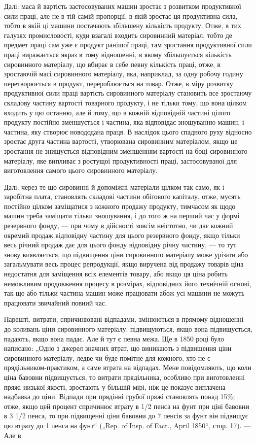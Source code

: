 Далі: маса й вартість застосовуваних машин зростає з розвитком
продуктивної сили праці, але не в тій самій пропорції,
в якій зростає ця продуктивна сила, тобто в якій ці машини
постачають збільшену кількість продукту. Отже, в тих галузях
промисловості, куди взагалі входить сировинний матеріал, тобто
де предмет праці сам уже є продукт ранішої праці, там зростання
продуктивної сили праці виражається якраз в тому відношенні,
в якому збільшується кількість сировинного матеріалу,
що вбирає в себе певну кількість праці, отже, в зростаючій масі
сировинного матеріалу, яка, наприклад, за одну робочу годину перетворюється
в продукт, перероблюється на товар. Отже, в
міру розвитку продуктивної сили праці вартість сировинного
матеріалу становить все зростаючу складову частину вартості
товарного продукту, і не тільки тому, що вона цілком входить
у цю останню, але й тому, що в кожній відповідній частині
цілого продукту постійно зменшується і частина, яка відповідає
зношуванню машин, і частина, яку створює новододана праця.
В наслідок цього спадного руху відносно зростає друга частина
вартості, утворювана сировинним матеріалом, якщо це зростання
не знищується відповідним зменшенням вартості на боці сировинного
матеріалу, яке випливає з ростущої продуктивності
праці, застосовуваної для виготовлення самого цього сировинного
матеріалу.

Далі: через те що сировинні й допоміжні матеріали цілком
так само, як і заробітна плата, становлять складові частини
обігового капіталу, отже, мусять постійно цілком заміщатися
з кожного продажу продукту, тимчасом як щодо машин треба
заміщати тільки зношування, і до того ж на перший час у формі
резервного фонду, — при чому в дійсності зовсім неістотно, чи
дає кожний окремий продаж відповідну частину для цього
резервного фонду, якщо тільки весь річний продаж дає для
цього фонду відповідну річну частину, — то тут знову виявляється,
що підвищення ціни сировинного матеріалу може урізати
або загальмувати весь процес репродукції, якщо виручена
від продажу товарів ціна недостатня для заміщення всіх елементів
товару, або якщо ця ціна робить неможливим продовження
процесу в розмірах, відповідних його технічній основі,
так що або тільки частина машин може працювати абож усі
машини не можуть працювати звичайний повний час.

Нарешті, витрати, спричинювані відпадами, змінюються в прямому
відношенні до коливань ціни сировинного матеріалу: підвищуються,
якщо вона підвищується, падають, якщо вона падає. Але
й тут є певна межа. Ще в 1850 році було написано: „Одно з джерел
значних втрат, що виникають з підвищення ціни сировинного
матеріалу, ледве чи буде помітне для кожного, хто не є
прядільником-практиком, а саме втрата на відпадах. Мене повідомляють,
що коли ціна бавовни підвищується, то витрати прядільника,
особливо при виготовленні пряжі низької якості, зростають
у більшій мірі, ніж це показує виплачена надбавка до
ціни. Відпади при прядінні грубої пряжі становлять понад 15\%;
отже, якщо цей процент спричинює втрату в 1/2 пенса на фунт
при ціні бавовни в 3 1/2 пенса, то при підвищенні ціни бавовни
до 7 пенсів за фунт він підвищує цю втрату до 1 пенса на
фунт“ („Rep. of Insp. of Fact., April 1850“, стор. 17). — Але в
\parbreak{}  %
